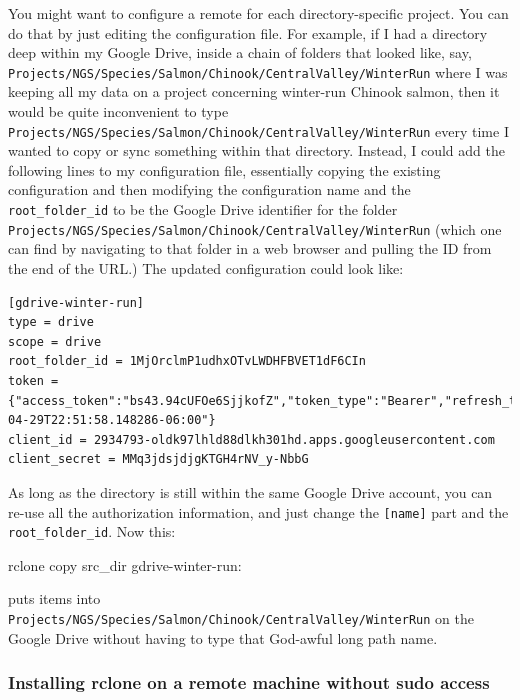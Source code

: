 \documentclass[]{krantz}
\makeatletter
\newenvironment{Shaded}{\begin{snugshade}}{\end{snugshade}}
\newcommand{\ExtensionTok}[1]{#1}
\newcommand{\NormalTok}[1]{#1}
\newenvironment{kframe}{%
\medskip{}
\setlength{\fboxsep}{.8em}
 \def\at@end@of@kframe{}%
 \ifinner\ifhmode%
  \def\at@end@of@kframe{\end{minipage}}%
  \begin{minipage}{\columnwidth}%
 \fi\fi%
 \def\FrameCommand##1{\hskip\@totalleftmargin \hskip-\fboxsep
 \colorbox{shadecolor}{##1}\hskip-\fboxsep
     \hskip-\linewidth \hskip-\@totalleftmargin \hskip\columnwidth}%
 \MakeFramed {\advance\hsize-\width
   \@totalleftmargin\z@ \linewidth\hsize
   \@setminipage}}%
 {\par\unskip\endMakeFramed%
 \at@end@of@kframe}
\renewenvironment{Shaded}{\begin{kframe}}{\end{kframe}}
\makeatother
\begin{document}
You might want to configure a remote for each directory-specific project.
You can do that by just editing the configuration file. For example,
if I had a directory deep within my Google Drive, inside a chain of folders that
looked like, say, \texttt{Projects/NGS/Species/Salmon/Chinook/CentralValley/WinterRun}
where I was keeping
all my data on a project concerning winter-run Chinook salmon, then it would be
quite inconvenient to type \texttt{Projects/NGS/Species/Salmon/Chinook/CentralValley/WinterRun}
every time I wanted to copy or sync something within that directory. Instead,
I could add the following
lines to my configuration file, essentially copying the existing configuration and
then modifying the configuration name and the \texttt{root\_folder\_id} to be the
Google Drive identifier for the folder \texttt{Projects/NGS/Species/Salmon/Chinook/CentralValley/WinterRun} (which
one can find by navigating to that folder in a web browser and pulling the ID from the
end of the URL.) The updated configuration could look like:

\begin{verbatim}
[gdrive-winter-run]
type = drive
scope = drive
root_folder_id = 1MjOrclmP1udhxOTvLWDHFBVET1dF6CIn
token = {"access_token":"bs43.94cUFOe6SjjkofZ","token_type":"Bearer","refresh_token":"1/MrtfsRoXhgc","expiry":"2019-04-29T22:51:58.148286-06:00"}
client_id = 2934793-oldk97lhld88dlkh301hd.apps.googleusercontent.com
client_secret = MMq3jdsjdjgKTGH4rNV_y-NbbG
\end{verbatim}

As long as the directory is still within the same Google Drive account, you can re-use
all the authorization information, and just change the \texttt{{[}name{]}} part and the \texttt{root\_folder\_id}.
Now this:

\begin{Shaded}
\begin{Highlighting}[]
\ExtensionTok{rclone}\NormalTok{ copy src_dir gdrive-winter-run: }
\end{Highlighting}
\end{Shaded}

puts items into \texttt{Projects/NGS/Species/Salmon/Chinook/CentralValley/WinterRun} on the Google Drive
without having to type that God-awful long path name.

\hypertarget{installing-rclone-on-a-remote-machine-without-sudo-access}{%
\subsubsection{Installing rclone on a remote machine without sudo access}\label{installing-rclone-on-a-remote-machine-without-sudo-access}}
\end{document}
